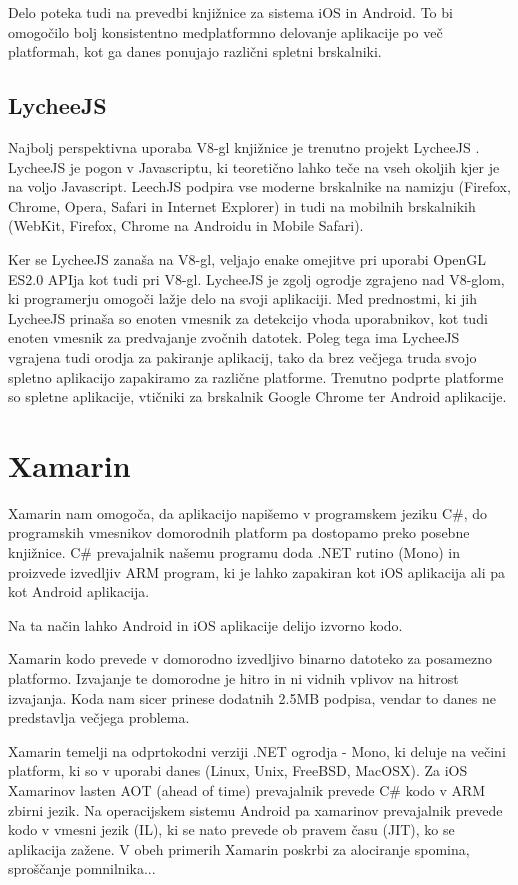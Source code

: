 Delo poteka tudi na prevedbi knjižnice za sistema iOS in Android. To bi omogočilo bolj konsistentno medplatformno delovanje aplikacije po več platformah, kot ga danes ponujajo različni spletni brskalniki.

\subsection{LycheeJS}

Najbolj perspektivna uporaba V8-gl knjižnice je trenutno projekt LycheeJS \cite{lycheejs}. LycheeJS je pogon v Javascriptu, ki teoretično lahko teče na vseh okoljih kjer je na voljo Javascript. LeechJS podpira vse moderne brskalnike na namizju (Firefox, Chrome, Opera, Safari in Internet Explorer) in tudi na mobilnih brskalnikih (WebKit, Firefox, Chrome na Androidu in Mobile Safari). 

Ker se LycheeJS zanaša na V8-gl, veljajo enake omejitve pri uporabi OpenGL ES2.0 APIja kot tudi pri V8-gl. LycheeJS je zgolj ogrodje zgrajeno nad V8-glom, ki programerju omogoči lažje delo na svoji aplikaciji. Med prednostmi, ki jih LycheeJS prinaša so enoten vmesnik za detekcijo vhoda uporabnikov, kot tudi enoten vmesnik za predvajanje zvočnih datotek. Poleg tega ima LycheeJS vgrajena tudi orodja za pakiranje aplikacij, tako da brez večjega truda svojo spletno aplikacijo zapakiramo za različne platforme. Trenutno podprte platforme so spletne aplikacije, vtičniki za brskalnik Google Chrome ter Android aplikacije.

\section{Xamarin}
\label{sec:xamarin}

Xamarin \cite{xamarin} nam omogoča, da aplikacijo napišemo v programskem jeziku C\#, do programskih vmesnikov domorodnih platform pa dostopamo preko posebne knjižnice. C\# prevajalnik našemu programu doda .NET rutino (Mono) in proizvede izvedljiv ARM program, ki je lahko zapakiran kot iOS aplikacija ali pa kot Android aplikacija.

Na ta način lahko Android in iOS aplikacije delijo izvorno kodo. 

Xamarin kodo prevede v domorodno izvedljivo binarno datoteko za posamezno platformo. Izvajanje te domorodne je hitro in ni vidnih vplivov na hitrost izvajanja. Koda nam sicer prinese dodatnih 2.5MB podpisa, vendar to danes ne predstavlja večjega problema.

Xamarin temelji na odprtokodni verziji .NET ogrodja - Mono, ki deluje na večini platform, ki so v uporabi danes (Linux, Unix, FreeBSD, MacOSX). Za iOS Xamarinov lasten AOT (ahead of time) prevajalnik prevede C\# kodo v ARM zbirni jezik. Na operacijskem sistemu Android pa xamarinov prevajalnik prevede kodo v vmesni jezik (IL), ki se nato prevede ob pravem času (JIT), ko se aplikacija zažene. V obeh primerih Xamarin poskrbi za alociranje spomina, sproščanje pomnilnika... %

